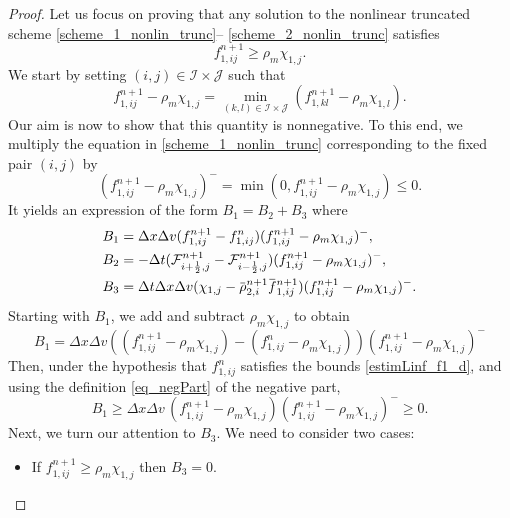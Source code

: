 \documentclass[reqno]{amsart}
\newcommand{\II}{\mathcal{I}}
\newcommand{\J}{\mathcal{J}}
\newcommand{\iph}{{i+\frac{1}{2}}}
\newcommand{\imh}{{i-\frac{1}{2}}}
\newcommand{\overbar}[1]{\mkern 1.5mu\overline{\mkern-1.5mu#1\mkern-1.5mu}\mkern 1.5mu}
\numberwithin{equation}{section}
\begin{document}
\begin{proof}
    Let us focus on proving that any solution to the nonlinear truncated scheme \eqref{scheme_1_nonlin_trunc}– \eqref{scheme_2_nonlin_trunc} satisfies
    \begin{equation*}
        f_{1,ij}^{n+1} \geq\rho_m\chi_{1,j}.
    \end{equation*}
    We start by setting $(i,j)\in\II\times\J$ such that 
    \begin{equation}\label{eq_ij_bounds}
        f_{1,ij}^{n+1} - \rho_m\chi_{1,j} = \underset{(k,l)\in\II\times\J}{\min}(f_{1,kl}^{n+1} - \rho_m\chi_{1,l}).
    \end{equation}
    Our aim is now to show that this quantity is nonnegative. To this end, we multiply the equation in \eqref{scheme_1_nonlin_trunc} corresponding to the fixed pair $(i,j)$ by
    \begin{equation}\label{eq_negPart}
        (f_{1,ij}^{n+1} - \rho_m\chi_{1,j})^-=\min(0,f_{1,ij}^{n+1} - \rho_m\chi_{1,j})\leq 0.
    \end{equation}
    It yields an expression of the form $B_1=B_2+B_3$ where
    \begin{align*}
        B_1 &= \Delta x\Delta v(f_{1,ij}^{n+1}-f_{1,ij}^{n})(f_{1,ij}^{n+1} - \rho_m\chi_{1,j})^-,\\
        B_2 &= -\Delta t(\mathcal{F}_{\iph,j}^{n+1}-\mathcal{F}_{\imh,j}^{n+1})(f_{1,ij}^{n+1} - \rho_m\chi_{1,j})^-,\\
        B_3 &=  \Delta t\Delta x\Delta v(\chi_{1,j}-\overbar{\rho}_{2,i}^{n+1}\overbar{f}_{1,ij}^{n+1})(f_{1,ij}^{n+1} - \rho_m\chi_{1,j})^-.
    \end{align*}
    Starting with $B_1$, we add and subtract $\rho_m\chi_{1,j}$ to obtain
    \begin{equation*}
        B_1 = \Delta x\Delta v( (f_{1,ij}^{n+1}-\rho_m\chi_{1,j}) - (f_{1,ij}^{n}-\rho_m\chi_{1,j}))(f_{1,ij}^{n+1} - \rho_m\chi_{1,j})^-
    \end{equation*}
    Then, under the hypothesis that $f^n_{1,ij}$ satisfies the bounds \eqref{estimLinf_f1_d}, and using the definition \eqref{eq_negPart} of the negative part, 
    \begin{equation}\label{estim_B1}
        B_1 \geq \Delta x\Delta v\,(f_{1,ij}^{n+1}-\rho_m\chi_{1,j})(f_{1,ij}^{n+1} - \rho_m\chi_{1,j})^- \geq 0.
    \end{equation}
    Next, we turn our attention to $B_3$. We need to consider two cases:
    \begin{itemize}
        \item If $f_{1,ij}^{n+1}\geq\rho_m\chi_{1,j}$ then $B_3=0$.

\end{itemize}
\end{proof}
\end{document}
